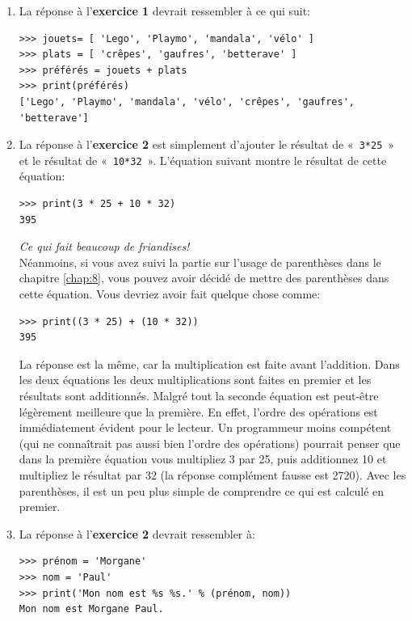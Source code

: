 \begin{enumerate}
\item La réponse à l'\textbf{exercice 1} devrait ressembler à ce qui suit:\\

\begin{small}
\begin{Verbatim}[frame=single,rulecolor=\color{mbleu}, label=à taper]
>>> jouets= [ 'Lego', 'Playmo', 'mandala', 'vélo' ]
>>> plats = [ 'crêpes', 'gaufres', 'betterave' ]
>>> préférés = jouets + plats
>>> print(préférés)
['Lego', 'Playmo', 'mandala', 'vélo', 'crêpes', 'gaufres', 'betterave']
\end{Verbatim}
\end{small}
\item  La réponse à l'\textbf{exercice 2} est simplement d'ajouter le résultat de « \texttt{3*25} » et le résultat de « \texttt{10*32} ». L'équation suivant montre le résultat de cette équation:

\begin{Verbatim}[frame=single,rulecolor=\color{mbleu}, label=à taper]
>>> print(3 * 25 + 10 * 32)
395
\end{Verbatim}
\rm
\emph{Ce qui fait beaucoup de friandises!}\\

Néanmoins, si vous avez suivi la partie sur l'usage de parenthèses dans le chapitre \ref{chap:8}, vous pouvez avoir décidé de mettre des parenthèses dans cette équation. Vous devriez avoir fait quelque chose comme:
\tt
\begin{Verbatim}[frame=single,rulecolor=\color{mbleu}, label=à taper]
>>> print((3 * 25) + (10 * 32))
395
\end{Verbatim}
\rm

La réponse est la même, car la multiplication est faite avant l'addition. Dans les deux équations les deux multiplications sont faites en premier et les résultats sont additionnés. Malgré tout la seconde équation est peut-être légèrement meilleure que la première. En effet, l'ordre des opérations est immédiatement évident pour le lecteur. Un programmeur moins compétent (qui ne connaîtrait pas aussi bien l'ordre des opérations) pourrait penser que dans la première équation vous multipliez 3 par 25, puis additionnez 10 et multipliez le résultat par 32 (la réponse complément fausse est 2720). Avec les parenthèses, il est un peu plus simple de comprendre ce qui est calculé en premier.

\item  La réponse à l'\textbf{exercice 2} devrait ressembler à:
\tt
\begin{Verbatim}[frame=single,rulecolor=\color{mbleu}, label=à taper]
>>> prénom = 'Morgane'
>>> nom = 'Paul'
>>> print('Mon nom est %s %s.' % (prénom, nom))
Mon nom est Morgane Paul.
\end{Verbatim}
\rm

\end{enumerate}


